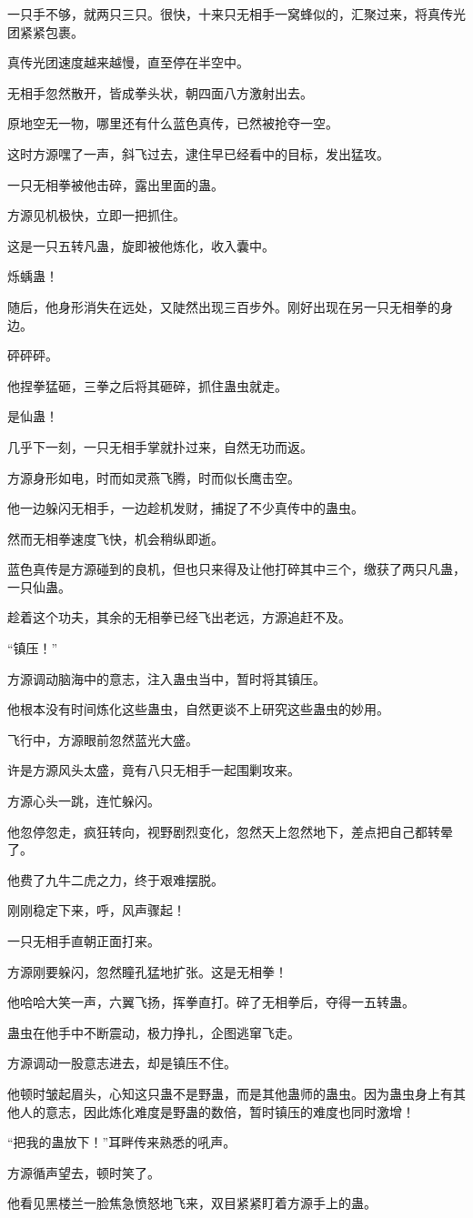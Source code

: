 \begin{this_body}
一只手不够，就两只三只。很快，十来只无相手一窝蜂似的，汇聚过来，将真传光团紧紧包裹。

真传光团速度越来越慢，直至停在半空中。

无相手忽然散开，皆成拳头状，朝四面八方激射出去。

原地空无一物，哪里还有什么蓝色真传，已然被抢夺一空。

这时方源嘿了一声，斜飞过去，逮住早已经看中的目标，发出猛攻。

一只无相拳被他击碎，露出里面的蛊。

方源见机极快，立即一把抓住。

这是一只五转凡蛊，旋即被他炼化，收入囊中。

烁蝺蛊！

随后，他身形消失在远处，又陡然出现三百步外。刚好出现在另一只无相拳的身边。

砰砰砰。

他捏拳猛砸，三拳之后将其砸碎，抓住蛊虫就走。

是仙蛊！

几乎下一刻，一只无相手掌就扑过来，自然无功而返。

方源身形如电，时而如灵燕飞腾，时而似长鹰击空。

他一边躲闪无相手，一边趁机发财，捕捉了不少真传中的蛊虫。

然而无相拳速度飞快，机会稍纵即逝。

蓝色真传是方源碰到的良机，但也只来得及让他打碎其中三个，缴获了两只凡蛊，一只仙蛊。

趁着这个功夫，其余的无相拳已经飞出老远，方源追赶不及。

“镇压！”

方源调动脑海中的意志，注入蛊虫当中，暂时将其镇压。

他根本没有时间炼化这些蛊虫，自然更谈不上研究这些蛊虫的妙用。

飞行中，方源眼前忽然蓝光大盛。

许是方源风头太盛，竟有八只无相手一起围剿攻来。

方源心头一跳，连忙躲闪。

他忽停忽走，疯狂转向，视野剧烈变化，忽然天上忽然地下，差点把自己都转晕了。

他费了九牛二虎之力，终于艰难摆脱。

刚刚稳定下来，呼，风声骤起！

一只无相手直朝正面打来。

方源刚要躲闪，忽然瞳孔猛地扩张。这是无相拳！

他哈哈大笑一声，六翼飞扬，挥拳直打。碎了无相拳后，夺得一五转蛊。

蛊虫在他手中不断震动，极力挣扎，企图逃窜飞走。

方源调动一股意志进去，却是镇压不住。

他顿时皱起眉头，心知这只蛊不是野蛊，而是其他蛊师的蛊虫。因为蛊虫身上有其他人的意志，因此炼化难度是野蛊的数倍，暂时镇压的难度也同时激增！

“把我的蛊放下！”耳畔传来熟悉的吼声。

方源循声望去，顿时笑了。

他看见黑楼兰一脸焦急愤怒地飞来，双目紧紧盯着方源手上的蛊。

\end{this_body}

